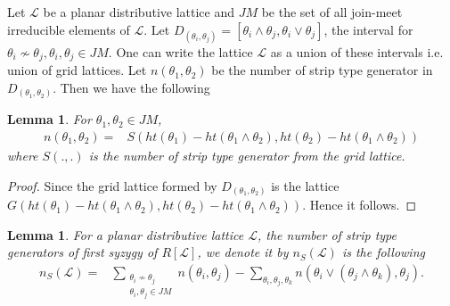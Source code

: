 \documentclass[10pt,reqno]{amsart}
\numberwithin{equation}{section}
\newtheorem{lemma}[theorem]{Lemma}
\begin{document}
 Let $\mathcal{L}$ be a planar distributive lattice and $JM$ be the set of all join-meet irreducible elements of $\mathcal{L}$.
Let $D_{(\theta_i,\theta_j)}=[\theta_i \wedge \theta_j,\theta_i \vee \theta_j]$, the interval for $\theta_i \nsim \theta_j, 
\theta_i, \theta_j \in JM$.
One can write the lattice $\mathcal{L}$ as a union of these intervals i.e. union of grid lattices. Let $n(\theta_1,\theta_2)$ be the number of strip 
type generator in $D_{(\theta_1,\theta_2)}$. Then we have the following 
\begin{lemma}
For $\theta_1,\theta_2 \in JM$,
\begin{align*}
 n(\theta_1,\theta_2)=& S(ht(\theta_1)-ht(\theta_1 \wedge \theta_2), ht(\theta_2)-ht(\theta_1 \wedge \theta_2))
\end{align*}
where $S(.,.)$ is the number of strip type generator from the grid lattice.
\end{lemma}
\begin{proof} Since the grid lattice formed by $D_{(\theta_1,\theta_2)}$ is the lattice 
$G(ht(\theta_1)-ht(\theta_1 \wedge \theta_2),ht(\theta_2)-ht(\theta_1 \wedge \theta_2))$. Hence it follows.
\end{proof}
\begin{lemma}
\label{one}
 For a planar distributive lattice $\mathcal{L}$, the number of strip type generators of first syzygy of $R[\mathcal{L}]$, we denote it by 
 $n_{S}(\mathcal{L})$ is the following
 \begin{align*}
 n_{S}(\mathcal{L}) =& \sum_{\substack{\theta_i \nsim \theta_j \\ \theta_i,\theta_j \in JM}} n(\theta_i,\theta_j)
  - \sum_{\theta_i,\theta_j,\theta_k} n(\theta_i \vee(\theta_j \wedge \theta_k),\theta_j).
\end{align*}
 \end{lemma}
 
\end{document}
